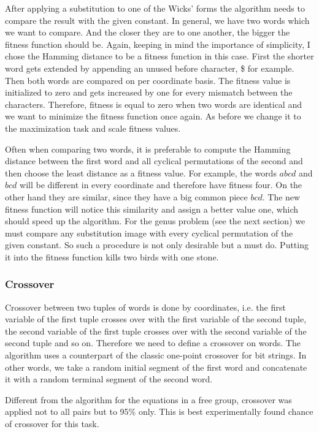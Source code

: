 \documentclass{article}
\begin{document}
After applying a substitution to one of the Wicks' forms the algorithm
needs to compare the result with the given constant. In general, we
have two words which we want to compare. And the closer they are to
one another, the bigger the fitness function should be. Again, keeping
in mind the importance of simplicity, I chose the Hamming distance to
be a fitness function in this case. First the shorter word gets
extended by appending an unused before character, \$ for example. Then
both words are compared on per coordinate basis. The fitness value is
initialized to zero and gets increased by one for every mismatch
between the characters. Therefore, fitness is equal to zero when two
words are identical and we want to minimize the fitness function once
again. As before we change it to the maximization task and scale
fitness values. 

Often when comparing two words, it is preferable to compute the
Hamming distance between the first word and all cyclical permutations
of the second and then choose the least distance as a fitness
value. For example, the words $a b c d$ and $b c d$ will be different
in every coordinate and therefore have fitness four. On the other hand
they are similar, since they have a big common piece $b c d$. The new
fitness function will notice this similarity and assign a better value
one, which should speed up the algorithm. For the genus problem (see
the next section) we must compare any substitution image with every
cyclical permutation of the given constant. So such a procedure is not
only desirable but a must do. Putting it into the fitness function
kills two birds with one stone.

    \subsubsection{Crossover}

Crossover between two tuples of words is done by coordinates,
i.e. the first variable of the first tuple crosses over with the
first variable of the second tuple, the second variable of the first
tuple crosses over with the second variable of the second tuple and
so on. Therefore we need to define a crossover on words. The algorithm
uses a counterpart of the classic one-point crossover for bit
strings. In other words, we take a random initial segment of the first
word and concatenate it with a random terminal segment of the second
word.

Different from the algorithm for the equations in a free group,
crossover was applied not to all pairs but to 95\% only. This is best
experimentally found chance of crossover for this task.
\end{document}
